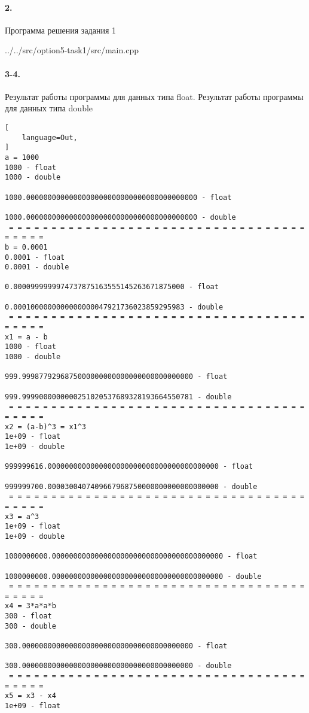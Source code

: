 \paragraph{2.} Программа решения задания 1


{../../src/option5-task1/src/main.cpp}

\paragraph{3-4.} Результат работы программы для данных типа float. Результат работы программы для данных типа double

\begin{lstlisting}[
    language=Out,
]
a = 1000
1000 - float
1000 - double
                                   1000.0000000000000000000000000000000000000000 - float
                                   1000.0000000000000000000000000000000000000000 - double
 = = = = = = = = = = = = = = = = = = = = = = = = = = = = = = = = = = = = = = = =
b = 0.0001
0.0001 - float
0.0001 - double
                                      0.0000999999974737875163555145263671875000 - float
                                      0.0001000000000000000047921736023859295983 - double
 = = = = = = = = = = = = = = = = = = = = = = = = = = = = = = = = = = = = = = = =
x1 = a - b
1000 - float
1000 - double
                                    999.9998779296875000000000000000000000000000 - float
                                    999.9999000000000251020537689328193664550781 - double
 = = = = = = = = = = = = = = = = = = = = = = = = = = = = = = = = = = = = = = = =
x2 = (a-b)^3 = x1^3
1e+09 - float
1e+09 - double
                              999999616.0000000000000000000000000000000000000000 - float
                              999999700.0000300407409667968750000000000000000000 - double
 = = = = = = = = = = = = = = = = = = = = = = = = = = = = = = = = = = = = = = = =
x3 = a^3
1e+09 - float
1e+09 - double
                             1000000000.0000000000000000000000000000000000000000 - float
                             1000000000.0000000000000000000000000000000000000000 - double
 = = = = = = = = = = = = = = = = = = = = = = = = = = = = = = = = = = = = = = = =
x4 = 3*a*a*b
300 - float
300 - double
                                    300.0000000000000000000000000000000000000000 - float
                                    300.0000000000000000000000000000000000000000 - double
 = = = = = = = = = = = = = = = = = = = = = = = = = = = = = = = = = = = = = = = =
x5 = x3 - x4
1e+09 - float

\end{lstlisting}
